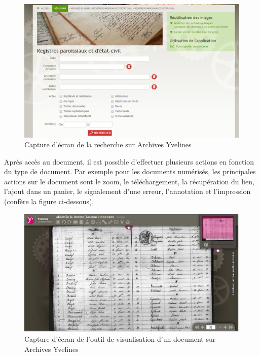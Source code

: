         \begin{figure}[ht!]
            \centering
            \includegraphics[width=1\textwidth]{figure/screen_yvelines_recherche.png}
            \caption{Capture d'écran de la recherche sur Archives Yvelines}
            \label{fig:gallica}
        \end{figure}

        Après accès au document, il est possible d’effectuer plusieurs actions  en fonction du type de document. Par exemple pour les documents numérisés, les principales actions sur le document sont le zoom, le téléchargement, la récupération du lien, l’ajout dans un panier, le signalement d’une erreur, l’annotation et l’impression (confère la figure ci-dessous).

        \begin{figure}[ht!]
            \centering
            \includegraphics[width=1\textwidth]{figure/screen_yvelines_document.png}
            \caption{Capture d'écran de l'outil de visualisation d'un document sur Archives Yvelines}
            \label{fig:gallica}
        \end{figure}

